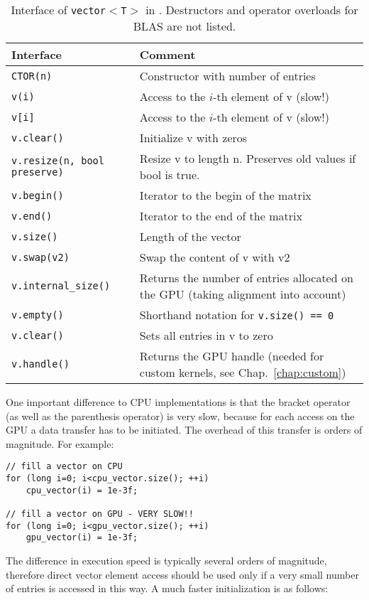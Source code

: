 \begin{table}[tb]
\begin{center}
\begin{tabular}{p{6.5cm}|p{8.5cm}}
Interface & Comment\\
\hline
\texttt{CTOR(n)}    & Constructor with number of entries \\
\texttt{v(i)}    & Access to the $i$-th element of v (slow!) \\
\texttt{v[i]}    & Access to the $i$-th element of v (slow!) \\
\texttt{v.clear()}    & Initialize v with zeros \\
\texttt{v.resize(n, bool preserve)}    & Resize v to length n. Preserves old values if bool is true. \\
\texttt{v.begin()}   & Iterator to the begin of the matrix \\
\texttt{v.end()}   & Iterator to the end of the matrix \\
\texttt{v.size()}    & Length of the vector \\
\texttt{v.swap(v2)}   & Swap the content of v with v2 \\
\texttt{v.internal\_size()} & Returns the number of entries allocated on the GPU (taking alignment into account) \\
\texttt{v.empty()}   & Shorthand notation for \texttt{v.size() == 0} \\
\texttt{v.clear()}   & Sets all entries in v to zero \\
\texttt{v.handle()}  & Returns the GPU handle (needed for custom kernels, see Chap.~\ref{chap:custom})
\end{tabular}
\caption{Interface of \texttt{vector$<$T$>$} in \ViennaCL. Destructors and
operator overloads for BLAS are not listed.}
\label{tab:vector-interface}
\end{center}
\end{table}

One important difference to CPU implementations is that the bracket operator
(as well as the parenthesis operator) is very slow, because for each access on the GPU a
data transfer has to be initiated. The overhead of this transfer is orders of
magnitude. For example:

  \begin{lstlisting}
// fill a vector on CPU
for (long i=0; i<cpu_vector.size(); ++i)
    cpu_vector(i) = 1e-3f;

// fill a vector on GPU - VERY SLOW!!
for (long i=0; i<gpu_vector.size(); ++i)
    gpu_vector(i) = 1e-3f;
\end{lstlisting} 
The difference in execution speed is typically several orders of magnitude,
therefore direct vector element access should be used only if a very small
number of entries is accessed in this way. A much faster initialization is as
follows:

